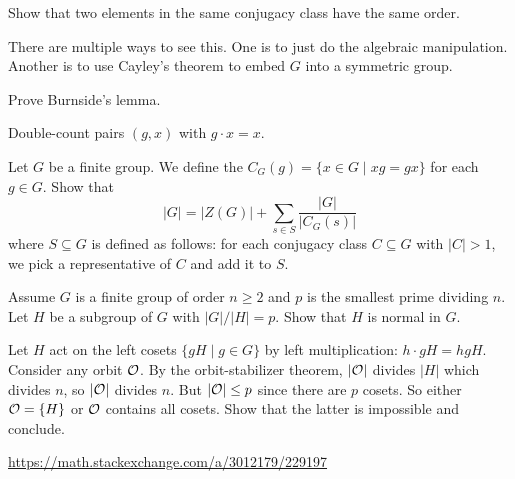\begin{problem}
	Show that two elements in the same conjugacy class
	have the same order.
	\begin{hint}
		There are multiple ways to see this.
		One is to just do the algebraic manipulation.
		Another is to use Cayley's theorem to embed $G$ into a symmetric group.
	\end{hint}
\end{problem}

\begin{problem}
	\onechili
	Prove Burnside's lemma.
	\begin{hint}
		Double-count pairs $(g,x)$ with $g \cdot x = x$.
	\end{hint}
\end{problem}

\begin{sproblem}
	\label{prob:class_eq}
	Let $G$ be a finite group.
	We define the  $C_G(g) = \{ x \in G \mid xg = gx \}$
	for each $g \in G$.
	Show that
	\[ \left\lvert G \right\rvert = \left\lvert Z(G) \right\rvert + \sum_{s \in S}
	\frac{\left\lvert G \right\rvert}{\left\lvert C_G(s) \right\rvert} \]
	where $S \subseteq G$ is defined as follows:
	for each conjugacy class $C \subseteq G$ with $|C| > 1$,
	we pick a representative of $C$ and add it to $S$.
\end{sproblem}

\begin{dproblem}
	[Classical]
	\onechili
    Assume $G$ is a finite group of order $n \ge 2$ and $p$ is the
    smallest prime dividing $n$. Let $H$ be a subgroup of $G$ with
    $\left\lvert G \right\rvert / \left\lvert H \right\rvert = p$.
	Show that $H$ is normal in $G$.
    \begin{hint}
        Let $H$ act on the left cosets $\{gH \mid g \in G\}$
        by left multiplication: $h \cdot gH = hgH$.
        Consider any orbit $\mathcal O$.
        By the orbit-stabilizer theorem, $\left\lvert \mathcal O \right\rvert$
        divides $\left\lvert H \right\rvert$ which divides $n$, so $\left\lvert \mathcal O \right\rvert$
        divides $n$. But $\left\lvert \mathcal O \right\rvert \le p$ since
        there are $p$ cosets. So either $\mathcal O = \{H\}$ or $\mathcal O$ contains
        all cosets. Show that the latter is impossible and conclude.
    \end{hint}
	\begin{sol}
		\url{https://math.stackexchange.com/a/3012179/229197}
	\end{sol}
\end{dproblem}
